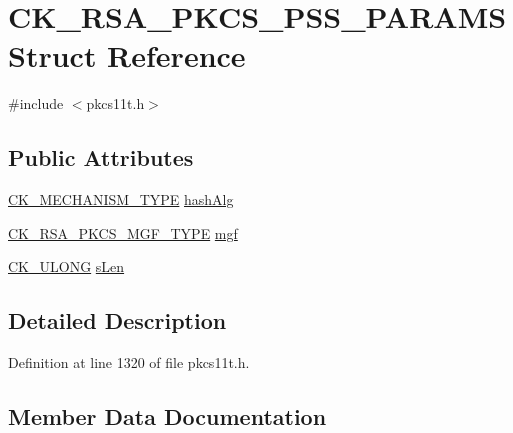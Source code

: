 \hypertarget{struct_c_k___r_s_a___p_k_c_s___p_s_s___p_a_r_a_m_s}{}\section{C\+K\+\_\+\+R\+S\+A\+\_\+\+P\+K\+C\+S\+\_\+\+P\+S\+S\+\_\+\+P\+A\+R\+A\+MS Struct Reference}
\label{struct_c_k___r_s_a___p_k_c_s___p_s_s___p_a_r_a_m_s}


{\ttfamily \#include $<$pkcs11t.\+h$>$}

\subsection*{Public Attributes}
\begin{DoxyCompactItemize}
\item 
\hyperlink{pkcs11t_8h_aaf1084907f5cc09a3e0b85ab022a240d}{C\+K\+\_\+\+M\+E\+C\+H\+A\+N\+I\+S\+M\+\_\+\+T\+Y\+PE} \hyperlink{struct_c_k___r_s_a___p_k_c_s___p_s_s___p_a_r_a_m_s_aa4db3297a22a4148dbb5d96f33d10845}{hash\+Alg}
\item 
\hyperlink{pkcs11t_8h_a85bafbc5ca956ad99bbc6068334a98e6}{C\+K\+\_\+\+R\+S\+A\+\_\+\+P\+K\+C\+S\+\_\+\+M\+G\+F\+\_\+\+T\+Y\+PE} \hyperlink{struct_c_k___r_s_a___p_k_c_s___p_s_s___p_a_r_a_m_s_a61dc8196e9a08bb24683c6d4836fdd75}{mgf}
\item 
\hyperlink{pkcs11t_8h_a35181858a3b7a0a81f49d180d8f446ef}{C\+K\+\_\+\+U\+L\+O\+NG} \hyperlink{struct_c_k___r_s_a___p_k_c_s___p_s_s___p_a_r_a_m_s_a04aaadbd6be8a61d43ea4a15b6c562ed}{s\+Len}
\end{DoxyCompactItemize}


\subsection{Detailed Description}


Definition at line 1320 of file pkcs11t.\+h.



\subsection{Member Data Documentation}
\mbox{\label{struct_c_k___r_s_a___p_k_c_s___p_s_s___p_a_r_a_m_s_aa4db3297a22a4148dbb5d96f33d10845}} 
